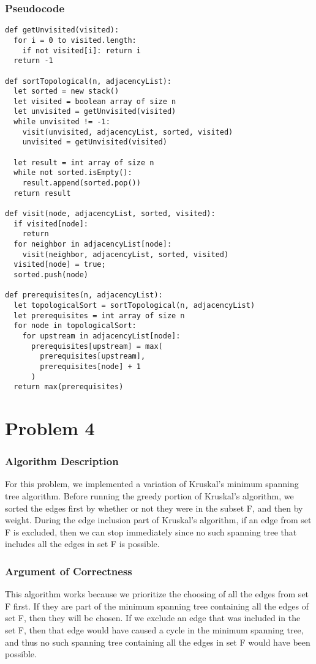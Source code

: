 \documentclass{math}
\begin{document}
\subsubsection*{Pseudocode}
\begin{lstlisting}
def getUnvisited(visited):
  for i = 0 to visited.length:
    if not visited[i]: return i
  return -1

def sortTopological(n, adjacencyList):
  let sorted = new stack()
  let visited = boolean array of size n
  let unvisited = getUnvisited(visited)
  while unvisited != -1:
    visit(unvisited, adjacencyList, sorted, visited)
    unvisited = getUnvisited(visited)

  let result = int array of size n
  while not sorted.isEmpty():
    result.append(sorted.pop())
  return result

def visit(node, adjacencyList, sorted, visited):
  if visited[node]:
    return
  for neighbor in adjacencyList[node]:
    visit(neighbor, adjacencyList, sorted, visited)
  visited[node] = true;
  sorted.push(node)

def prerequisites(n, adjacencyList):
  let topologicalSort = sortTopological(n, adjacencyList)
  let prerequisites = int array of size n
  for node in topologicalSort:
    for upstream in adjacencyList[node]:
      prerequisites[upstream] = max(
        prerequisites[upstream],
        prerequisites[node] + 1
      )
  return max(prerequisites)
\end{lstlisting}

\section*{Problem 4}

\subsubsection*{Algorithm Description}
For this problem, we implemented a variation of Kruskal's minimum spanning tree
algorithm. Before running the greedy portion of Kruskal's algorithm, we sorted
the edges first by whether or not they were in the subset F, and then by weight.
During the edge inclusion part of Kruskal's algorithm, if an edge from set F is
excluded, then we can stop immediately since no such spanning tree that includes
all the edges in set F is possible.

\subsubsection*{Argument of Correctness}
This algorithm works because we prioritize the choosing of all the edges from
set F first. If they are part of the minimum spanning tree containing all the
edges of set F, then they will be chosen. If we exclude an edge that was
included in the set F, then that edge would have caused a cycle in the minimum
spanning tree, and thus no such spanning tree containing all the edges in set
F would have been possible.
\end{document}
